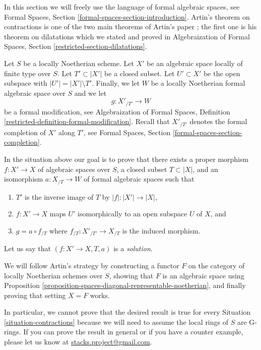\noindent
In this section we will freely use the language of formal algebraic spaces,
see Formal Spaces, Section \ref{formal-spaces-section-introduction}.
Artin's theorem on contractions is one of the two main theorems of
Artin's paper \cite{ArtinII}; the first one is his theorem on dilatations
which we stated and proved in Algebraization of Formal Spaces,
Section \ref{restricted-section-dilatations}.

\begin{situation}
\label{situation-contractions}
Let $S$ be a locally Noetherian scheme. Let $X'$ be an algebraic space
locally of finite type over $S$. Let $T' \subset |X'|$ be a closed
subset. Let $U' \subset X'$ be the open subspace with
$|U'| = |X'| \setminus T'$. Finally, we let $W$ be a locally Noetherian
formal algebraic space over $S$ and we let
$$
g : X'_{/T'} \longrightarrow W
$$
be a formal modification, see
Algebraization of Formal Spaces, Definition
\ref{restricted-definition-formal-modification}.
Recall that $X'_{/T'}$ denotes the formal completion of $X'$ along
$T'$, see Formal Spaces, Section \ref{formal-spaces-section-completion}.
\end{situation}

\noindent
In the situation above our goal is to prove that there exists a
proper morphism $f : X' \to X$ of algebraic spaces over $S$,
a closed subset $T \subset |X|$, and an isomorphism
$a : X_{/T} \to W$ of formal algebraic spaces such that
\begin{enumerate}
\item $T'$ is the inverse image of $T$ by $|f| : |X'| \to |X|$,
\item $f : X' \to X$ maps $U'$ isomorphically to
an open subspace $U$ of $X$, and
\item $g = a \circ f_{/T}$ where $f_{/T} : X'_{/T'} \to X_{/T}$
is the induced morphism.
\end{enumerate}
Let us say that $(f : X' \to X, T, a)$ is a {\it solution}.

\medskip\noindent
We will follow Artin's strategy by constructing a functor $F$ on
the category of locally Noetherian schemes over $S$, showing that $F$ is an
algebraic space using
Proposition \ref{proposition-spaces-diagonal-representable-noetherian},
and finally proving that setting $X = F$ works.

\begin{remark}
\label{remark-G-rings}
In particular, we cannot prove that the desired result is true for
every Situation \ref{situation-contractions} because we will need to
assume the local rings of $S$ are G-rings. If you can prove the
result in general or if you have a counter example, please let
us know at
\href{mailto:stacks.project@gmail.com}{stacks.project@gmail.com}.
\end{remark}

